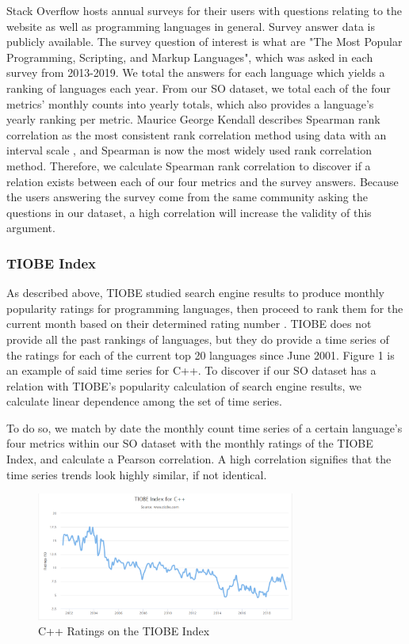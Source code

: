 \documentclass[conference]{IEEEtran}
\begin{document}
Stack Overflow hosts annual surveys \cite{survey} for their users with questions relating to the website as well as programming languages in general. Survey answer data is publicly available. The survey question of interest is what are "The Most Popular Programming, Scripting, and Markup Languages", which was asked in each survey from 2013-2019. We total the answers for each language which yields a ranking of languages each year. From our SO dataset, we total each of the four metrics' monthly counts into yearly totals, which also provides a language's yearly ranking per metric. Maurice George Kendall describes Spearman rank correlation as the most consistent rank correlation method using data with an interval scale \cite{rank}, and Spearman is now the most widely used rank correlation method. Therefore, we calculate Spearman rank correlation to discover if a relation exists between each of our four metrics and the survey answers. Because the users answering the survey come from the same community asking the questions in our dataset, a high correlation will increase the validity of this argument.

\subsubsection{TIOBE Index}

As described above, TIOBE studied search engine results to produce monthly popularity ratings for programming languages, then proceed to rank them for the current month based on their determined rating number \cite{tiobe}. TIOBE does not provide all the past rankings of languages, but they do provide a time series of the ratings for each of the current top 20 languages since June 2001. Figure 1 is an example of said time series for C++. To discover if our SO dataset has a relation with TIOBE's popularity calculation of search engine results, we calculate linear dependence among the set of time series.

To do so, we match by date the monthly count time series of a certain language's four metrics within our SO dataset with the monthly ratings of the TIOBE Index, and calculate a Pearson correlation. A high correlation signifies that the time series trends look highly similar, if not identical.

\begin{figure}[h]
\includegraphics[width=8.5cm]{tiobe_c++.PNG}
\centering
\caption{C++ Ratings on the TIOBE Index}
\end{figure}
\end{document}
